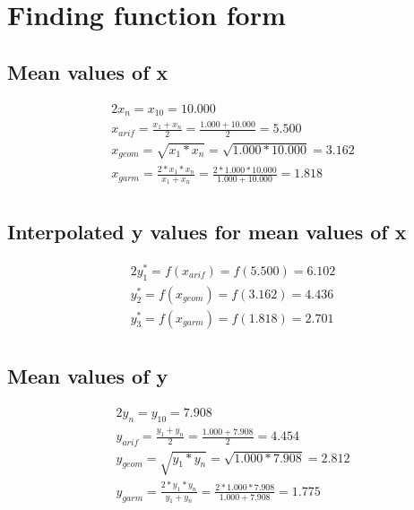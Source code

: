\documentclass{article}%
\begin{document}
%
\normalsize%
\section{Finding function form}%
\label{sec:Findingfunctionform}%
\subsection{Mean values of x}%
\label{subsec:Meanvaluesofx}%
\begin{alignat*}{2}%
x_n = x_{10} = {10.000} \\%
x_{arif}
        = \frac {x_1 + x_n} 2
        = \frac {1.000 + 10.000} 2
        = 5.500 \\%
x_{geom}
        = \sqrt {x_1 * x_n}
        = \sqrt {1.000 * 10.000}
        = 3.162 \\%
x_{garm}
        = \frac {2 * x_1 * x_n} {x_1 + x_n}
        = \frac {2 * 1.000 * 10.000} {1.000 + 10.000}
        = 1.818 \\%
\end{alignat*}

%
\subsection{Interpolated y values for mean values of x}%
\label{subsec:Interpolatedyvaluesformeanvaluesofx}%
\begin{alignat*}{2}%
y_1^*
                        = f(x_{arif})
                        = f(5.500)
                        = 6.102 \\%
y_2^*
                        = f(x_{geom})
                        = f(3.162)
                        = 4.436 \\%
y_3^*
                        = f(x_{garm})
                        = f(1.818)
                        = 2.701 \\%
\end{alignat*}

%
\subsection{Mean values of y}%
\label{subsec:Meanvaluesofy}%
\begin{alignat*}{2}%
y_n = y_{10} = {7.908} \\%
y_{arif}
        = \frac {y_1 + y_n} 2
        = \frac {1.000 + 7.908} 2
        = 4.454 \\%
y_{geom}
        = \sqrt {y_1 * y_n}
        = \sqrt {1.000 * 7.908}
        = 2.812 \\%
y_{garm}
        = \frac {2 * y_1 * y_n} {y_1 + y_n}
        = \frac {2 * 1.000 * 7.908} {1.000 + 7.908}
        = 1.775 \\%
\end{alignat*}
\end{document}
